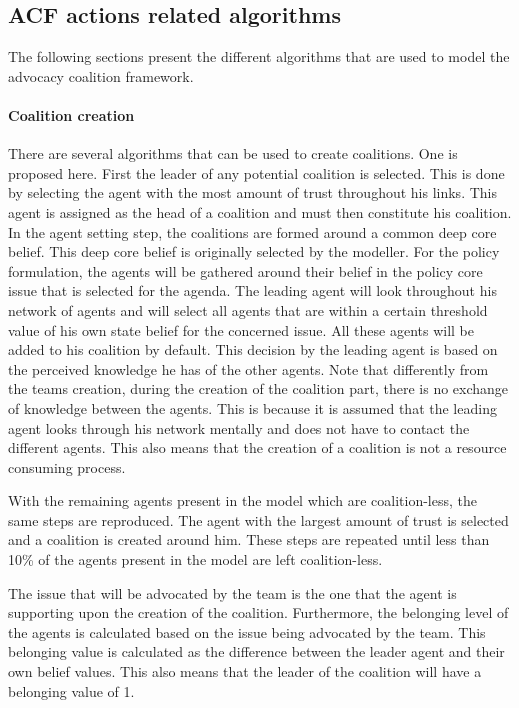 \subsection{ACF actions related algorithms}

The following sections present the different algorithms that are used to model the advocacy coalition framework.

\paragraph{Coalition creation}

There are several algorithms that can be used to create coalitions. One is proposed here. First the leader of any potential coalition is selected. This is done by selecting the agent with the most amount of trust throughout his links. This agent is assigned as the head of a coalition and must then constitute his coalition. In the agent setting step, the coalitions are formed around a common deep core belief. This deep core belief is originally selected by the modeller. For the policy formulation, the agents will be gathered around their belief in the policy core issue that is selected for the agenda. The leading agent will look throughout his network of agents and will select all agents that are within a certain threshold value of his own state belief for the concerned issue. All these agents will be added to his coalition by default. This decision by the leading agent is based on the perceived knowledge he has of the other agents. Note that differently from the teams creation, during the creation of the coalition part, there is no exchange of knowledge between the agents. This is because it is assumed that the leading agent looks through his network mentally and does not have to contact the different agents. This also means that the creation of a coalition is not a resource consuming process.

With the remaining agents present in the model which are coalition-less, the same steps are reproduced. The agent with the largest amount of trust is selected and a coalition is created around him. These steps are repeated until less than 10\% of the agents present in the model are left coalition-less.

The issue that will be advocated by the team is the one that the agent is supporting upon the creation of the coalition. Furthermore, the belonging level of the agents is calculated based on the issue being advocated by the team. This belonging value is calculated as the difference between the leader agent and their own belief values. This also means that the leader of the coalition will have a belonging value of 1.

